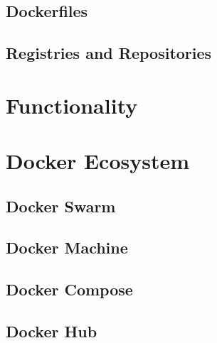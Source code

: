   \subsection{Dockerfiles} %
  \label{sub:dockerfiles}
  

  \subsection{Registries and Repositories} %
  \label{sub:registries_and_repositories}
  


\section{Functionality} %
\label{sec:functionality}


\section{Docker Ecosystem} %
\label{sec:docker_ecosystem}

  \subsection{Docker Swarm} %
  \label{sub:docker_swarm}
    

  \subsection{Docker Machine} %
  \label{sub:docker_machine}
  

  \subsection{Docker Compose} %
  \label{sub:docker_compose}
  

  \subsection{Docker Hub} %
  \label{sub:docker_hub}
  

